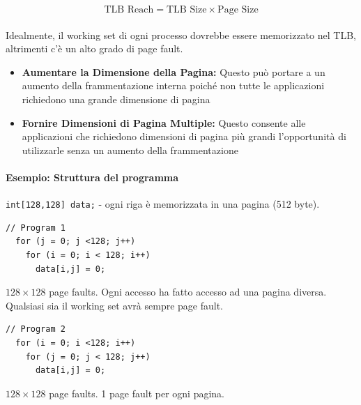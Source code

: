 \begin{equation*}
  \text{TLB Reach} = \text{TLB Size} \times \text{Page Size}
\end{equation*}
\paragraph{}

Idealmente, il working set di ogni processo dovrebbe essere memorizzato nel TLB, altrimenti c'è
un alto grado di page fault.


\begin{itemize}
  \item \textbf{Aumentare la Dimensione della Pagina: } Questo può portare a un aumento della frammentazione interna poiché non tutte
        le applicazioni richiedono una grande dimensione di pagina
  \item \textbf{Fornire Dimensioni di Pagina Multiple: } Questo consente alle applicazioni che
        richiedono dimensioni di pagina più grandi l'opportunità di utilizzarle senza un aumento della
        frammentazione
\end{itemize}

\paragraph{Esempio: Struttura del programma}

\texttt{int[128,128] data;} - ogni riga è memorizzata in una pagina (512 byte).


\begin{center}
  \centering
  \begin{minipage}{0.85\linewidth}
    \begin{minipage}{0.45\linewidth}
      \begin{verbatim}
// Program 1
  for (j = 0; j <128; j++) 
    for (i = 0; i < 128; i++) 
      data[i,j] = 0;
\end{verbatim}
      $128 \times 128$ page faults. Ogni accesso ha fatto accesso ad una pagina diversa. Qualsiasi sia il working set avrà sempre page fault.
    \end{minipage}%
    \hfill
    \begin{minipage}{0.45\linewidth}
      \begin{verbatim}
// Program 2
  for (i = 0; i <128; i++) 
    for (j = 0; j < 128; j++) 
      data[i,j] = 0;
\end{verbatim}
      $128 \times 128$ page faults. 1 page fault per ogni pagina.
    \end{minipage}
  \end{minipage}
\end{center}

